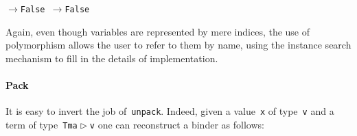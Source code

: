 \documentclass[9pt,authoryear]{sigplanconf}
\begin{document}
{{}\vphantom{$\{$}}\texttt{\mbox{\hspace{0.50em}}}\texttt{\mbox{\hspace{0.50em}}}\texttt{\mbox{\hspace{0.50em}}}\texttt{\mbox{\hspace{0.50em}}}\texttt{\mbox{\hspace{0.50em}}}\texttt{\mbox{\hspace{0.50em}}}\texttt{\makebox[1.22ex][c]{\_{}}}\texttt{\mbox{\hspace{0.50em}}}\texttt{$ \rightarrow $}\texttt{\mbox{\hspace{0.50em}}}\texttt{False}\texttt{{\nopagebreak \newline%
}\vphantom{$\{$}}\texttt{\mbox{\hspace{0.50em}}}\texttt{\mbox{\hspace{0.50em}}}\texttt{\mbox{\hspace{0.50em}}}\texttt{\mbox{\hspace{0.50em}}}\texttt{\makebox[1.22ex][c]{\_{}}}\texttt{\mbox{\hspace{0.50em}}}\texttt{$ \rightarrow $}\texttt{\mbox{\hspace{0.50em}}}\texttt{False}\texttt{{\nopagebreak \newline%
}\vphantom{$\{$}}%


%
Again, even though variables are represented by mere indices, the
    use of polymorphism allows the user to refer to them by name,
    using the instance search mechanism to fill in the details of
    implementation.%


\paragraph*{Pack}

%
It is easy to invert the job of{~}\texttt{unpack}. Indeed, given a
    value{~}\texttt{x} of type{~}\texttt{v} and a term of type{~}\texttt{Tm}\texttt{\mbox{\hspace{0.50em}}}\texttt{\makebox[1.22ex][l]{$ {(} $}}\texttt{a}\texttt{\mbox{\hspace{0.50em}}}\texttt{$ \vartriangleright $}\texttt{\mbox{\hspace{0.50em}}}\texttt{v}\texttt{\makebox[1.22ex][r]{$ {)} $}} one can
    reconstruct a binder as follows{:} %


{\nopagebreak }
\end{document}
